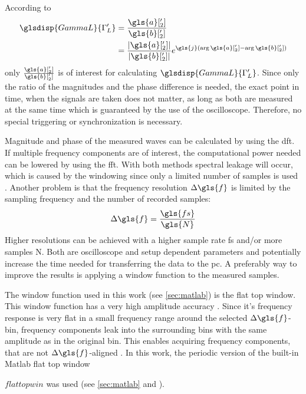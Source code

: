 \documentclass[12pt,a4paper,parskip=full,abstract=true,BCOR=12mm]{scrreprt}
\providecommand{\abs}[1]{\lvert#1\rvert}
\newcommand*{\SavedLstInline}{}
\DeclareRobustCommand*{\lstinline}{%
  \ifmmode
    \let\SavedBGroup\bgroup
    \def\bgroup{%
      \let\bgroup\SavedBGroup
      \hbox\bgroup
    }%
  \fi
  \SavedLstInline
}
\begin{document}
According to
\begin{equation}\label{eq:gl_phase}
    \begin{split}
        \glsdisp{GammaL}{\Gamma'_L} & = \frac{\gls{a}['_2]}{\gls{b}['_2]} \\
                     & = \frac{\abs{\gls{a}['_2]}}{\abs{\gls{b}['_2]}} e^{\gls{j}(\arg{\gls{a}['_2]}-\arg{\gls{b}['_2]})}
    \end{split}
\end{equation}
only $\frac{\gls{a}['_2]}{\gls{b}['_2]}$ is
of interest for calculating $\glsdisp{GammaL}{\Gamma'_L}$. Since only the ratio of the magnitudes
and the phase difference is needed, the exact point in time, when the signals are
taken does not matter, as long as both are measured at the same time which is guaranteed
by the use of the oscilloscope. Therefore, no special triggering or synchronization is necessary.

Magnitude and phase of the measured waves can be calculated by using
the \gls{dft}. If multiple frequency components are of interest, the computational
power needed can be lowered by using the \gls{fft}. With both methods
spectral leakage will occur, which is caused by the windowing since only a limited number of samples is used \cite{harris_use_1978}.
Another problem is that the frequency resolution $\Delta{}\gls{f}$ is limited by the sampling
frequency and the number of recorded samples:
\begin{equation}
    \label{eq:fres} \Delta{}\gls{f} = \frac{\gls{fs}}{\gls{N}}
\end{equation}
Higher resolutions
can be achieved with a higher sample rate \gls{fs} and/or more samples \gls{N}. Both are oscilloscope and setup
dependent parameters and potentially increase the time needed for transferring the data to the
\gls{pc}. A preferably way to improve the results is applying a window function to the
measured samples.

The window function used in this work (see \cref{sec:matlab}) is the flat top window.
This window function has a very high amplitude accuracy \cite{heinzel_spectrum_2002}.
Since it's frequency response is very flat in a small frequency range around the selected $\Delta{}\gls{f}$-bin, frequency components leak
into the surrounding bins with the same amplitude as in the original bin. This enables acquiring frequency components, that are not $\Delta{}\gls{f}$-aligned \cite{heinzel_spectrum_2002}.
In this work, the periodic version of the built-in Matlab flat top window \lstinline$flattopwin$
was used (see \cref{sec:matlab} and \cite{matlab_flattop}).
\end{document}
